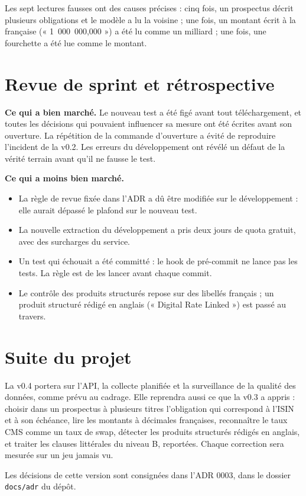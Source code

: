 \documentclass[11pt,a4paper]{article}
\begin{document}
Les sept lectures fausses ont des causes précises : cinq fois, un prospectus décrit plusieurs obligations et le modèle a lu la voisine ; une fois, un montant écrit à la française (« 1~000~000,000 ») a été lu comme un milliard ; une fois, une fourchette a été lue comme le montant.


\section{Revue de sprint et rétrospective}

\textbf{Ce qui a bien marché.} Le nouveau test a été figé avant tout téléchargement, et toutes les décisions qui pouvaient influencer sa mesure ont été écrites avant son ouverture. La répétition de la commande d'ouverture a évité de reproduire l'incident de la v0.2. Les erreurs du développement ont révélé un défaut de la vérité terrain avant qu'il ne fausse le test.

\textbf{Ce qui a moins bien marché.}
\begin{itemize}
  \item La règle de revue fixée dans l'ADR a dû être modifiée sur le développement : elle aurait dépassé le plafond sur le nouveau test.
  \item La nouvelle extraction du développement a pris deux jours de quota gratuit, avec des surcharges du service.
  \item Un test qui échouait a été committé : le hook de pré-commit ne lance pas les tests. La règle est de les lancer avant chaque commit.
  \item Le contrôle des produits structurés repose sur des libellés français ; un produit structuré rédigé en anglais (« Digital Rate Linked ») est passé au travers.
\end{itemize}

\section{Suite du projet}

La v0.4 portera sur l'API, la collecte planifiée et la surveillance de la qualité des données, comme prévu au cadrage. Elle reprendra aussi ce que la v0.3 a appris : choisir dans un prospectus à plusieurs titres l'obligation qui correspond à l'ISIN et à son échéance, lire les montants à décimales françaises, reconnaître le taux CMS comme un taux de swap, détecter les produits structurés rédigés en anglais, et traiter les clauses littérales du niveau B, reportées. Chaque correction sera mesurée sur un jeu jamais vu.

Les décisions de cette version sont consignées dans l'ADR 0003, dans le dossier \texttt{docs/adr} du dépôt.
\end{document}
